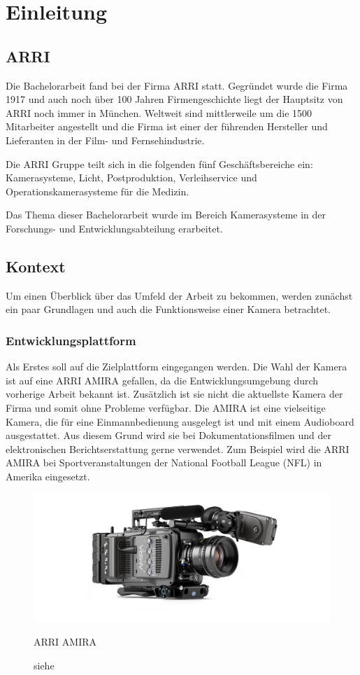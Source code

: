 \chapter{Einleitung}

\section{\acl{ARRI}}
Die Bachelorarbeit fand bei der Firma \ac{ARRI} statt. Gegründet wurde die Firma 1917 und auch noch über 100 Jahren Firmengeschichte liegt der Hauptsitz von \ac{ARRI} noch immer in München. 
Weltweit sind mittlerweile um die 1500 Mitarbeiter angestellt und die Firma ist einer der führenden Hersteller und Lieferanten in der Film- und Fernsehindustrie.

Die \ac{ARRI} Gruppe teilt sich in die folgenden fünf Geschäftsbereiche ein: Kamerasysteme, Licht, Postproduktion, Verleihservice und Operationskamerasysteme für die Medizin. \cite{arricorpinfo}

Das Thema dieser Bachelorarbeit wurde im Bereich Kamerasysteme in der Forschungs- und Entwicklungsabteilung erarbeitet.

\section{Kontext}
Um einen Überblick über das Umfeld der Arbeit zu bekommen, werden zunächst ein paar Grundlagen und auch die Funktionsweise einer Kamera betrachtet.


\subsection{Entwicklungsplattform}
Als Erstes soll auf die Zielplattform eingegangen werden. Die Wahl der Kamera ist auf eine \ac{ARRI} AMIRA gefallen, da die Entwicklungsumgebung durch vorherige Arbeit bekannt ist. Zusätzlich ist sie nicht die aktuellste Kamera der Firma und somit ohne Probleme verfügbar.
Die AMIRA ist eine vielseitige Kamera, die für eine Einmannbedienung ausgelegt ist und mit einem Audioboard ausgestattet. Aus diesem Grund wird sie bei Dokumentationsfilmen und der elektronischen Berichtserstattung gerne verwendet. Zum Beispiel wird die \ac{ARRI} AMIRA bei Sportveranstaltungen der National Football League (NFL) in Amerika eingesetzt.\cite{arrinewsamira} 

\begin{figure}[!hbtp]
	\centering
	\includegraphics[width = 0.7\linewidth]{pictures/amira-product-image-data.jpg}
	\hspace*{0\textwidth}
	\caption{ARRI AMIRA}
	\caption*{siehe \cite{arriamira_bild}}
	\label{fig:amira}
\end{figure}  

